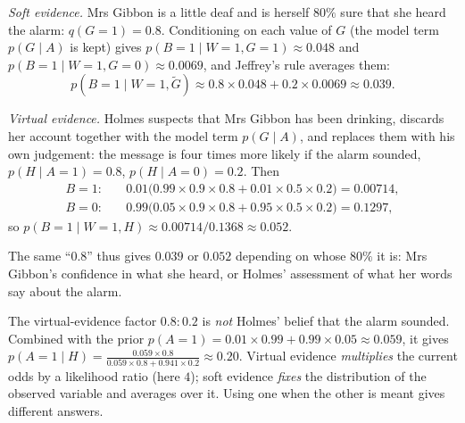 \begin{notechapter}
\emph{Soft evidence.} Mrs Gibbon is a little deaf and is herself $80\%$ sure that she
heard the alarm: $q(G = 1) = 0.8$. Conditioning on each value of $G$ (the model
term $p(G\mid A)$ is kept) gives $p(B = 1\mid W = 1, G = 1)\approx0.048$ and
$p(B = 1\mid W = 1, G = 0)\approx0.0069$, and Jeffrey's rule averages them:
\[
  p(B = 1\mid W = 1,\tilde G)\approx0.8\times0.048 + 0.2\times0.0069\approx0.039 .
\]

\emph{Virtual evidence.} Holmes suspects that Mrs Gibbon has been drinking, discards
her account together with the model term $p(G\mid A)$, and replaces them with his
own judgement: the message is four times more likely if the alarm sounded,
$p(H\mid A = 1) = 0.8$, $p(H\mid A = 0) = 0.2$. Then
\begin{align*}
  B = 1:&\quad 0.01\bigl(0.99\times0.9\times0.8 + 0.01\times0.5\times0.2\bigr) = 0.00714,\\
  B = 0:&\quad 0.99\bigl(0.05\times0.9\times0.8 + 0.95\times0.5\times0.2\bigr) = 0.1297,
\end{align*}
so $p(B = 1\mid W = 1, H)\approx0.00714/0.1368\approx0.052$.

The same ``$0.8$'' thus gives $0.039$ or $0.052$ depending on whose $80\%$ it is:
Mrs Gibbon's confidence in what she heard, or Holmes' assessment of what her words
say about the alarm.

\begin{pitfall}
The virtual-evidence factor $0.8 : 0.2$ is \emph{not} Holmes' belief that the alarm
sounded. Combined with the prior $p(A = 1) = 0.01\times0.99 + 0.99\times0.05\approx0.059$,
it gives $p(A = 1\mid H) = \frac{0.059\times0.8}{0.059\times0.8 + 0.941\times0.2}\approx0.20$.
Virtual evidence \emph{multiplies} the current odds by a likelihood ratio (here
$4$); soft evidence \emph{fixes} the distribution of the observed variable and
averages over it. Using one when the other is meant gives different answers.
\end{pitfall}


\end{notechapter}
